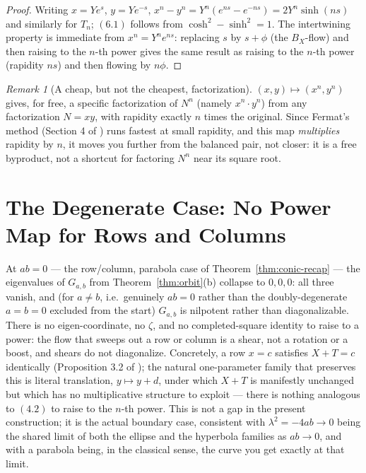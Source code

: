 \documentclass[11pt]{amsart}
\theoremstyle{remark}
\newtheorem*{remark}{Remark}
\begin{document}
\begin{proof}
Writing $x=Ye^s$, $y=Ye^{-s}$, $x^n-y^n=Y^n(e^{ns}-e^{-ns})=2Y^n\sinh(ns)$ and similarly for $T_n$; $(6.1)$ follows from $\cosh^2-\sinh^2=1$. The intertwining property is immediate from $x^n=Y^ne^{ns}$: replacing $s$ by $s+\phi$ (the $B_X$-flow) and then raising to the $n$-th power gives the same result as raising to the $n$-th power (rapidity $ns$) and then flowing by $n\phi$.
\end{proof}

\begin{remark}[A cheap, but not the cheapest, factorization]
$(x,y)\mapsto(x^n,y^n)$ gives, for free, a specific factorization of $N^n$ (namely $x^n\cdot y^n$) from any factorization $N=xy$, with rapidity exactly $n$ times the original. Since Fermat's method (Section 4 of \cite{Ebert2026Table}) runs fastest at small rapidity, and this map \emph{multiplies} rapidity by $n$, it moves you further from the balanced pair, not closer: it is a free byproduct, not a shortcut for factoring $N^n$ near its square root.
\end{remark}

\section{The Degenerate Case: No Power Map for Rows and Columns}

At $ab=0$ --- the row/column, parabola case of Theorem~\ref{thm:conic-recap} --- the eigenvalues of $G_{a,b}$ from Theorem~\ref{thm:orbit}(b) collapse to $0,0,0$: all three vanish, and (for $a\ne b$, i.e.\ genuinely $ab=0$ rather than the doubly-degenerate $a=b=0$ excluded from the start) $G_{a,b}$ is nilpotent rather than diagonalizable. There is no eigen-coordinate, no $\zeta$, and no completed-square identity to raise to a power: the flow that sweeps out a row or column is a shear, not a rotation or a boost, and shears do not diagonalize. Concretely, a row $x=c$ satisfies $X+T=c$ identically (Proposition 3.2 of \cite{Ebert2026Table}); the natural one-parameter family that preserves this is literal translation, $y\mapsto y+d$, under which $X+T$ is manifestly unchanged but which has no multiplicative structure to exploit --- there is nothing analogous to $(4.2)$ to raise to the $n$-th power. This is not a gap in the present construction; it is the actual boundary case, consistent with $\lambda^2=-4ab\to0$ being the shared limit of both the ellipse and the hyperbola families as $ab\to0$, and with a parabola being, in the classical sense, the curve you get exactly at that limit.
\end{document}

